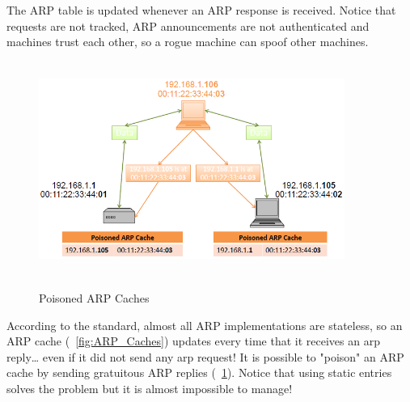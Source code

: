 The ARP table is updated whenever an ARP response is received. Notice that requests are not tracked, ARP announcements are not authenticated and machines trust each other, so a rogue machine can spoof other machines.\begin{figure}[htbp]
	\centering%
	\subfigure%
	{\includegraphics[height=7cm, width=10cm, keepaspectratio]{Immagini/reti/Poisoned_ARP_Caches.png}}
	\caption{Poisoned ARP Caches\label{fig:Poisoned_ARP_Caches}} 	
\end{figure}
According to the standard, almost all ARP implementations are stateless, so an ARP cache (\figurename~\ref{fig:ARP_Caches}) updates every time that it receives an arp reply… even if it did not send any arp request! It is possible to "poison" an ARP cache by sending gratuitous ARP replies (\figurename~\ref{fig:Poisoned_ARP_Caches}). Notice that using static entries solves the problem but it is almost impossible to manage!

